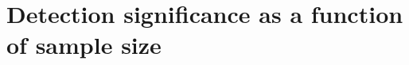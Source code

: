 
\label{sec:hzied_plato}
\label{ssec:robustness}

\section{Detection significance as a function of sample size}
\label{sec:detection_significance}

